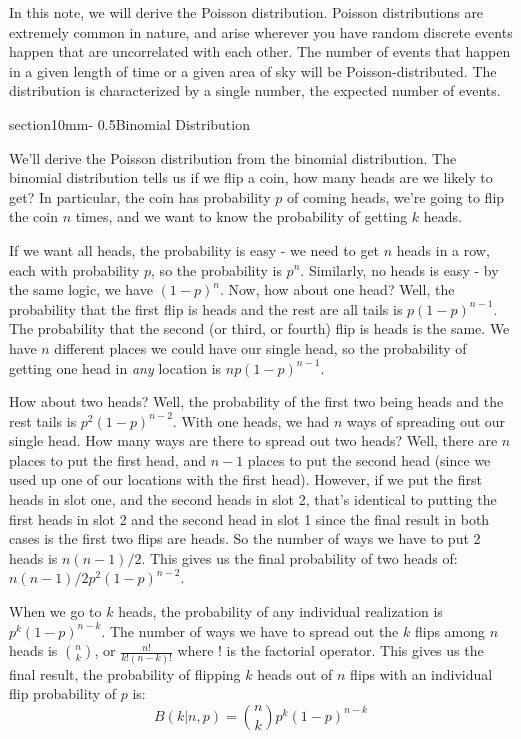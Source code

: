 \documentclass[letterpaper,11pt,preprint]{aastex}
\makeatletter
\renewcommand{\section}{\@startsection%
  {section}{1}{0mm}{-\baselineskip}%
  {0.5\baselineskip}{\normalfont\Large\bfseries}}%
\makeatother
\begin{document}
\pagestyle{plain}

In this note, we will derive the Poisson distribution.  Poisson
distributions are extremely common in nature, and arise wherever you
have random discrete events happen that are uncorrelated with each
other.  The number of events that happen in a given length of time or
a given area of sky will be Poisson-distributed.  The distribution is
characterized by a single number, the expected number of events.

\section{Binomial Distribution}

We'll derive the Poisson distribution from the binomial distribution.
The binomial distribution tells us if we flip a coin, how many heads
are we likely to get?  In particular, the coin has probability $p$ of
coming heads, we're going to flip the coin $n$ times, and we want to
know the probability of getting $k$ heads.  

If we want all heads, the probability is easy - we need to get $n$
heads in a row, each with probability $p$, so the probability is
$p^n$.  Similarly, no heads is easy - by the same logic, we have
$(1-p)^n$.  Now, how about one head?  Well, the probability that the
first flip is heads and the rest are all tails is $p(1-p)^{n-1}$.  The
probability that the second (or third, or fourth) flip is heads is the
same.  We have $n$ different places we could have our single head, so
the probability of getting one head in {\textit{any}} location is
$np(1-p)^{n-1}$.

How about two heads?  Well, the probability of the first two being
heads and the rest tails is $p^2(1-p)^{n-2}$.  With one heads, we had
$n$ ways of spreading out our single head.  How many ways are there to
spread out two heads?  Well, there are $n$ places to put the first
head, and $n-1$ places to put the second head (since we used up one of
our locations with the first head).  However, if we put the first
heads in slot one, and the second heads in slot 2, that's identical to
putting the first heads in slot 2 and the second head in slot 1 since
the final result in both cases is the first two flips are heads.  So
the number of ways we have to put 2 heads is $n(n-1)/2$.  This gives
us the final probability of two heads of: $n(n-1)/2p^2(1-p)^{n-2}$.

When we go to $k$ heads, the probability of any individual realization
is $p^k(1-p)^{n-k}$.  The number of ways we have to spread out the $k$
flips among $n$ heads is $n \choose k$, or $\frac{n!}{k!(n-k)!}$ where
$!$ is the factorial operator.  This gives us the final result, the
probability of flipping $k$ heads out of $n$ flips with an individual
flip probability of $p$ is:
$$B(k|n,p)={n \choose k}p^k(1-p)^{n-k}$$
\end{document}
